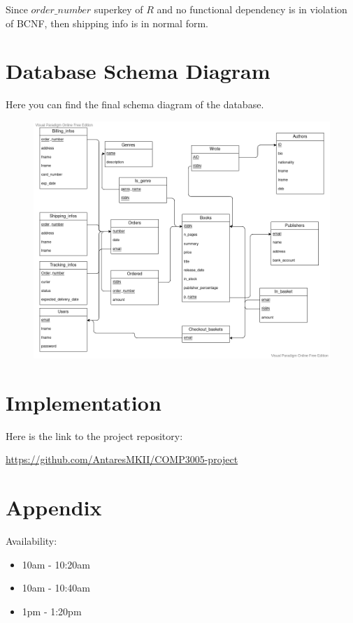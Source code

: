 \documentclass[fleqn]{scrreprt}
\begin{document}
Since $order\_number$ superkey of $R$ and no functional dependency is in violation
of BCNF, then shipping info is in normal form.

\chapter{Database Schema Diagram}
Here you can find the final schema diagram of the database.
\begin{figure}[h]\centering
    \includegraphics[width=\columnwidth]{database-schema-diagram.vpd.png}
    \label{fig:dsd}
\end{figure}

\chapter{Implementation}
Here is the link to the project repository:

\url{https://github.com/AntaresMKII/COMP3005-project}

\chapter{Appendix}
Availability:
\begin{itemize}
    \item 10am - 10:20am
    \item 10am - 10:40am
    \item 1pm - 1:20pm
\end{itemize}
\end{document}
